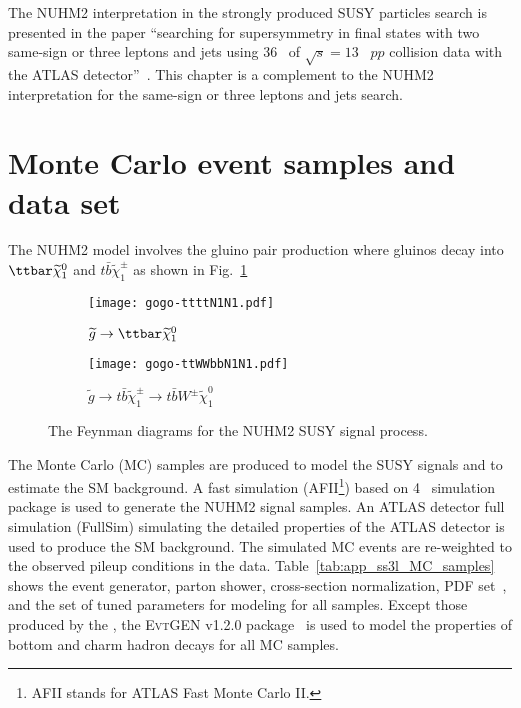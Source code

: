 The NUHM2 interpretation in the strongly produced SUSY particles search is presented in the paper ``searching for supersymmetry in final states with two same-sign or three leptons and jets using 36~{\ifb} of $\sqrt{s} = 13$~{\TeV} $pp$ collision data with the ATLAS detector''~\cite{Aaboud:2017dmy}.
This chapter is a complement to the NUHM2 interpretation for the same-sign or three leptons and jets search.


\section{Monte Carlo event samples and data set}
\label{app:ss3l_MC_samples}
The NUHM2 model involves the gluino pair production where gluinos decay into $\ttbar \widetilde{\chi}^{0}_{1}$ and $t\bar{b} \widetilde{\chi}^{\pm}_{1}$ as shown in Fig.~\ref{fig:app_ss3l_feynman_diagram}

\begin{figure}[htbp]
    \begin{subfigure}[b]{0.48\textwidth}
        \begin{center}
            \texttt{[image: gogo-ttttN1N1.pdf]}
            \caption{$\widetilde{g} \to \ttbar \widetilde{\chi}^{0}_{1}$}
        \end{center}
    \end{subfigure}
    \begin{subfigure}[b]{0.48\textwidth}
        \begin{center}
            \texttt{[image: gogo-ttWWbbN1N1.pdf]}
            \caption{$\widetilde{g} \to t\bar{b} \widetilde{\chi}^{\pm}_{1} \to t\bar{b} W^{\pm} \widetilde{\chi}^{0}_{1}$}
        \end{center}
    \end{subfigure}
    \caption{The Feynman diagrams for the NUHM2 SUSY signal process.}
    \label{fig:app_ss3l_feynman_diagram}
\end{figure}

The Monte Carlo (MC) samples are produced to model the SUSY signals and to estimate the SM background.
A fast simulation (AFII\footnote{AFII stands for ATLAS Fast Monte Carlo II.}) based on {\GEANT}4~\cite{Agostinelli:2002hh} simulation package is used to generate the NUHM2 signal samples.
An ATLAS detector full simulation (FullSim) simulating the detailed properties of the ATLAS detector is used to produce the SM background.
The simulated MC events are re-weighted to the observed pileup conditions in the data.
Table~\ref{tab:app_ss3l_MC_samples} shows the event generator, parton shower, cross-section normalization, PDF set~\cite{Martin:2009iq}, and the set of tuned parameters for modeling for all samples.
Except those produced by the {\SHERPA}, the \textsc{EvtGEN}\xspace v1.2.0 package~\cite{Lange:2001uf} is used to model the properties of bottom and charm hadron decays for all MC samples.

